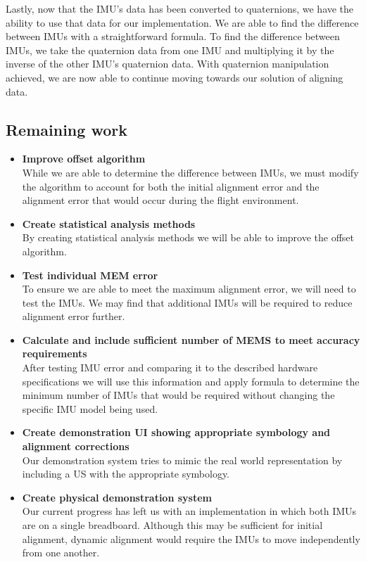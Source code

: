 Lastly, now that the IMU's data has been converted to quaternions, we have the ability to use that data for our implementation.
We are able to find the difference between IMUs with a straightforward formula.
To find the difference between IMUs, we take the quaternion data from one IMU and multiplying it by the inverse of the other IMU's quaternion data.
With quaternion manipulation achieved, we are now able to continue moving towards our solution of aligning data.\\

\subsection{Remaining work}
\begin{itemize}
	\item \textbf{Improve offset algorithm}\\
		While we are able to determine the difference between IMUs, we must modify the algorithm to account for both the initial alignment error and the alignment error that would occur during the flight environment.\\
	\item \textbf{Create statistical analysis methods}\\
		By creating statistical analysis methods we will be able to improve the offset algorithm.\\
	\item \textbf{Test individual MEM error}\\
		To ensure we are able to meet the maximum alignment error, we will need to test the IMUs. We may find that additional IMUs will be required to reduce alignment error further.\\
	\item \textbf{Calculate and include sufficient number of MEMS to meet accuracy requirements}\\
		After testing IMU error and comparing it to the described hardware specifications we will use this information and apply formula to determine the minimum number of IMUs that would be required without changing the specific IMU model being used.\\
	\item \textbf{Create demonstration UI showing appropriate symbology and alignment corrections}\\
		Our demonstration system tries to mimic the real world representation by including a US with the appropriate symbology.\\
	\item \textbf{Create physical demonstration system}\\
		Our current progress has left us with an implementation in which both IMUs are on a single breadboard. Although this may be sufficient for initial alignment, dynamic alignment would require the IMUs to move independently from one another.\\
\end{itemize}

